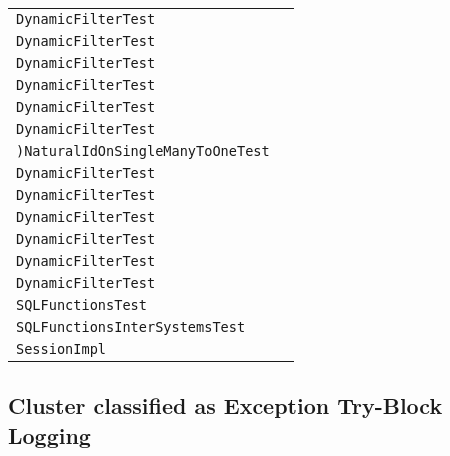 \begin{center}
\begin{tabular}{ll}
\lstinline/DynamicFilterTest/&\raisebox{0pt}{\lstinline/ getFilters()/}\\ 
\lstinline/DynamicFilterTest/&\raisebox{0pt}{\lstinline/ inStyleFilterParameter()/}\\ 
\lstinline/DynamicFilterTest/&\raisebox{0pt}{\lstinline/ oneToManyFilters()/}\\ 
\lstinline/DynamicFilterTest/&\raisebox{0pt}{\lstinline/ oneToManyFilters()/}\\ 
\lstinline/DynamicFilterTest/&\raisebox{0pt}{\lstinline/ filtersWithCustomerReadAndWrite()/}\\ 
\lstinline/DynamicFilterTest/&\raisebox{0pt}{\lstinline/ filtersWithCustomerReadAndWrite()/}\\ 
\lstinline/)NaturalIdOnSingleManyToOneTest/&\raisebox{0pt}{\lstinline/ mappingProperties()/}\\ 
\lstinline/DynamicFilterTest/&\raisebox{0pt}{\lstinline/ criteriaQueryFilters()/}\\ 
\lstinline/DynamicFilterTest/&\raisebox{0pt}{\lstinline/ criteriaQueryFilters()/}\\ 
\lstinline/DynamicFilterTest/&\raisebox{0pt}{\lstinline/ criteriaQueryFilters()/}\\ 
\lstinline/DynamicFilterTest/&\raisebox{0pt}{\lstinline/ hqlFilters()/}\\ 
\lstinline/DynamicFilterTest/&\raisebox{0pt}{\lstinline/ hqlFilters()/}\\ 
\lstinline/DynamicFilterTest/&\raisebox{0pt}{\lstinline/ hqlFilters()/}\\ 
\lstinline/SQLFunctionsTest/&\raisebox{0pt}{\lstinline/ sqlFunctionAsAlias()/}\\ 
\lstinline/SQLFunctionsInterSystemsTest/&\raisebox{0pt}{\lstinline/ testSqlFunctionAsAlias()/}\\ 
\lstinline/SessionImpl/&\raisebox{0pt}{\lstinline/ naturalIdLoadAccess(CriteriaImpl)/}\\ 

\bottomrule
\end{tabular}
\end{center}



\subsection{Cluster classified as Exception Try-Block Logging}

